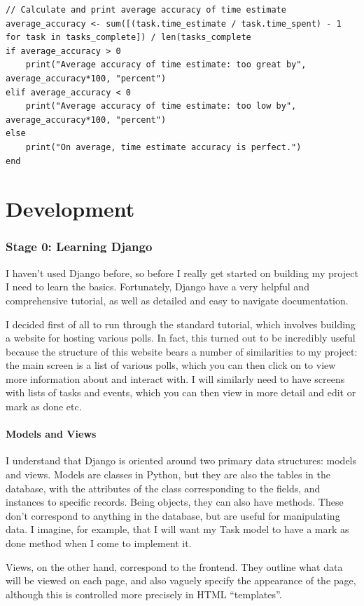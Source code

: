 \documentclass{article}
\begin{document}
\begin{lstlisting}[breaklines]
// Calculate and print average accuracy of time estimate
average_accuracy <- sum([(task.time_estimate / task.time_spent) - 1 for task in tasks_complete]) / len(tasks_complete
if average_accuracy > 0
    print("Average accuracy of time estimate: too great by", average_accuracy*100, "percent")
elif average_accuracy < 0
    print("Average accuracy of time estimate: too low by", average_accuracy*100, "percent")
else
    print("On average, time estimate accuracy is perfect.")
end
\end{lstlisting}

\part{Development}
\section{Stage 0: Learning Django}
I haven't used Django before,
so before I really get started on building my project I need to learn the basics.
Fortunately, Django have a very helpful and comprehensive tutorial,
as well as detailed and easy to navigate documentation.

I decided first of all to run through the standard tutorial,
which involves building a website for hosting various polls.
In fact, this turned out to be incredibly useful because the structure of this website bears a number of similarities to my project:
the main screen is a list of various polls,
which you can then click on to view more information about and interact with.
I will similarly need to have screens with lists of tasks and events,
which you can then view in more detail and edit or mark as done etc.

\subsection{Models and Views}
I understand that Django is oriented around two primary data structures:
models and views.
Models are classes in Python,
but they are also the tables in the database,
with the attributes of the class corresponding to the fields,
and instances to specific records.
Being objects, they can also have methods.
These don't correspond to anything in the database,
but are useful for manipulating data.
I imagine, for example, that I will want my Task model to have a mark as done method when I come to implement it.

Views, on the other hand, correspond to the frontend.
They outline what data will be viewed on each page,
and also vaguely specify the appearance of the page,
although this is controlled more precisely in HTML ``templates''.
\end{document}
